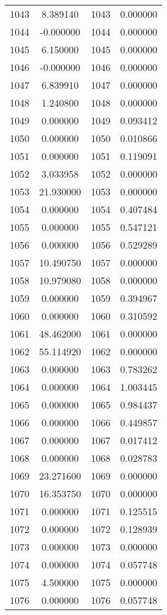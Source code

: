 \documentclass[12pt]{article}
\begin{document}
\begin{longtable}{@{}cccc@{}}
1043 & 8.389140 & 1043 & 0.000000 \\
1044 & -0.000000 & 1044 & 0.000000 \\
1045 & 6.150000 & 1045 & 0.000000 \\
1046 & -0.000000 & 1046 & 0.000000 \\
1047 & 6.839910 & 1047 & 0.000000 \\
1048 & 1.240800 & 1048 & 0.000000 \\
1049 & 0.000000 & 1049 & 0.093412 \\
1050 & 0.000000 & 1050 & 0.010866 \\
1051 & 0.000000 & 1051 & 0.119091 \\
1052 & 3.033958 & 1052 & 0.000000 \\
1053 & 21.930000 & 1053 & 0.000000 \\
1054 & 0.000000 & 1054 & 0.407484 \\
1055 & 0.000000 & 1055 & 0.547121 \\
1056 & 0.000000 & 1056 & 0.529289 \\
1057 & 10.490750 & 1057 & 0.000000 \\
1058 & 10.979080 & 1058 & 0.000000 \\
1059 & 0.000000 & 1059 & 0.394967 \\
1060 & 0.000000 & 1060 & 0.310592 \\
1061 & 48.462000 & 1061 & 0.000000 \\
1062 & 55.114920 & 1062 & 0.000000 \\
1063 & 0.000000 & 1063 & 0.783262 \\
1064 & 0.000000 & 1064 & 1.003445 \\
1065 & 0.000000 & 1065 & 0.984437 \\
1066 & 0.000000 & 1066 & 0.449857 \\
1067 & 0.000000 & 1067 & 0.017412 \\
1068 & 0.000000 & 1068 & 0.028783 \\
1069 & 23.271600 & 1069 & 0.000000 \\
1070 & 16.353750 & 1070 & 0.000000 \\
1071 & 0.000000 & 1071 & 0.125515 \\
1072 & 0.000000 & 1072 & 0.128939 \\
1073 & 0.000000 & 1073 & 0.000000 \\
1074 & 0.000000 & 1074 & 0.057748 \\
1075 & 4.500000 & 1075 & 0.000000 \\
1076 & 0.000000 & 1076 & 0.057748 \\

\end{longtable}
\end{document}
